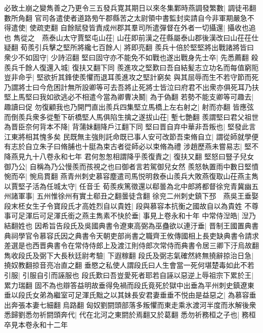 必致土崩之變雋善之乃更令三五發兵寛其期日以來冬集鄴時燕調發繁數|{
	調徒弔翻數所角翻}
官司各遣使者道路㫄午郡縣苦之太尉領中書監封奕請自今非軍期嚴急不得遣使|{
	使疏吏翻}
自餘賦發皆責成州郡其羣司所遣彈督在外者一切攝還|{
	攝收也追也}
雋從之　燕泰山太守賈堅屯山茌|{
	山茌即前漢之茌縣屬泰山郡後漢改曰山茌茌仕疑翻}
荀羨引兵擊之堅所將纔七百餘人|{
	將即亮翻}
羨兵十倍於堅堅將出戰諸將皆曰衆少不如固守|{
	少詩沼翻}
堅曰固守亦不能免不如戰也遂出戰身先士卒|{
	先悉薦翻}
殺羨兵千餘人復還入城|{
	復扶又翻下同}
羨進攻之堅歎曰吾自結髪志立功名而每值窮阨豈非命乎|{
	堅欲折其鋒使羨懼而退耳羨進攻之堅計窮矣}
與其屈辱而生不若守節而死乃謂將士曰今危困計無所設卿等可去吾將止死將士皆泣曰府君不出衆亦俱死耳乃扶堅上馬堅曰我如欲逃必不相遣今當為卿曹决鬭|{
	為于偽翻}
若勢不能支卿等可趣去|{
	趣讀曰促}
勿復顧我也乃開門直出羨兵四集堅立馬橋上左右射之|{
	射而亦翻}
皆應弦而倒羨兵衆多從塹下斫橋堅人馬俱陷生擒之遂拔山茌|{
	塹七艶翻}
羨謂堅曰君父祖世為晋臣奈何背本不降|{
	背蒲妹翻降戶江翻下同}
堅曰晋自弃中華非吾叛也|{
	堅發此言江東將相其愧多矣}
民既無主強則託命既已事人安可改節吾束脩自立|{
	謂從師就學便有志於自立朱子曰脩脯也十脡為束古者從師必以束脩為禮}
涉趙歷燕未嘗易志|{
	堅不降燕見九十八卷永和七年}
君何怱怱相謂降乎羨復責之|{
	復扶又翻}
堅怒曰豎子兒女御乃公|{
	自稱為乃公慢羨而孩視之也曰御者言若駕御兒女然}
羨怒執置雨中數日堅憤惋而卒|{
	惋烏貫翻}
燕青州刺史慕容塵遣司馬悦明救泰山羨兵大敗燕復取山茌燕主雋以賈堅子活為任城太守|{
	任音壬}
荀羨疾篤徵還以郗曇為北中郎將都督徐兖青冀幽五州諸軍事|{
	五州惟徐州有實土郗丑之翻曇徒含翻}
徐兖二州刺史鎮下邳　燕吳王垂娶段末柸女生子令寶段氏才高姓烈自以貴姓|{
	段與慕容本抗衡之國故自以為貴姓}
不尊事可足渾后可足渾氏銜之燕主雋素不快於垂|{
	事見上卷永和十年}
中常侍湼皓|{
	湼乃結翻姓也}
因希旨告段氏及吳國典書令遼東高弼為巫蠱欲以連汙垂|{
	晋制王國置典書典祠學官令慕容氏因之典書令天朝吏部尚書之職齊王攸傳國相上長吏缺典書令請求差選是也西晋典書令在常侍侍郎上及渡江則侍郎次常侍而典書令居三卿下汙烏故翻}
雋收段氏及弼下大長秋廷尉考驗|{
	下遐稼翻}
段氏及弼志氣確然終無撓辭掠治日急|{
	撓奴教翻掠音亮冶直之翻}
垂愍之私使人謂段氏曰人生會當一死何堪楚毒如此不若引服|{
	引服自引而誣服也}
段氏歎曰吾豈愛死者耶若自誣以惡逆上辱祖宗下累於王|{
	累力瑞翻}
固不為也辯答益明故垂得免禍而段氏竟死於獄中出垂為平州刺史鎮遼東垂以段氏女弟為繼室可足渾氏黜之以其妹長安君妻垂垂不悦由是益惡之|{
	為慕容垂出奔張本妻七細翻烏路翻}
匈奴劉閼頭部落多叛懼而東走乘氷渡河半度而氷解後衆悉歸劉悉勿祈閼頭奔代|{
	代在北河之東閼於焉翻又於葛翻}
悉勿祈務桓之子也|{
	務桓卒見本卷永和十二年}


